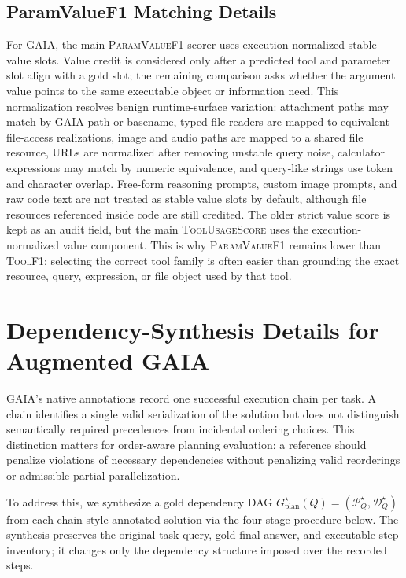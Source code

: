 \documentclass{article}
\providecommand{\metric}[1]{\textsc{#1}}
\begin{document}
\subsection{ParamValueF1 Matching Details}
\label{sec:appendix-param-value-f1}

For GAIA, the main \metric{ParamValueF1} scorer uses execution-normalized stable value slots. Value credit is considered only after a predicted tool and parameter slot align with a gold slot; the remaining comparison asks whether the argument value points to the same executable object or information need. This normalization resolves benign runtime-surface variation: attachment paths may match by GAIA path or basename, typed file readers are mapped to equivalent file-access realizations, image and audio paths are mapped to a shared file resource, URLs are normalized after removing unstable query noise, calculator expressions may match by numeric equivalence, and query-like strings use token and character overlap. Free-form reasoning prompts, custom image prompts, and raw code text are not treated as stable value slots by default, although file resources referenced inside code are still credited. The older strict value score is kept as an audit field, but the main \metric{ToolUsageScore} uses the execution-normalized value component. This is why \metric{ParamValueF1} remains lower than \metric{ToolF1}: selecting the correct tool family is often easier than grounding the exact resource, query, expression, or file object used by that tool.

\FloatBarrier

\section{Dependency-Synthesis Details for Augmented GAIA}
\label{sec:appendix-data-synthesis}

GAIA's native annotations record one successful execution chain per task.
A chain identifies a single valid serialization of the solution but does not
distinguish semantically required precedences from incidental ordering choices.
This distinction matters for order-aware planning evaluation: a reference should
penalize violations of necessary dependencies without penalizing valid
reorderings or admissible partial parallelization.

To address this, we synthesize a gold dependency DAG
$G_{\text{plan}}^\star(Q) = (\mathcal{P}_Q^\star, \mathcal{D}_Q^\star)$
from each chain-style annotated solution via the four-stage procedure below.
The synthesis preserves the original task query, gold final answer, and
executable step inventory; it changes only the dependency structure imposed
over the recorded steps.
\end{document}
